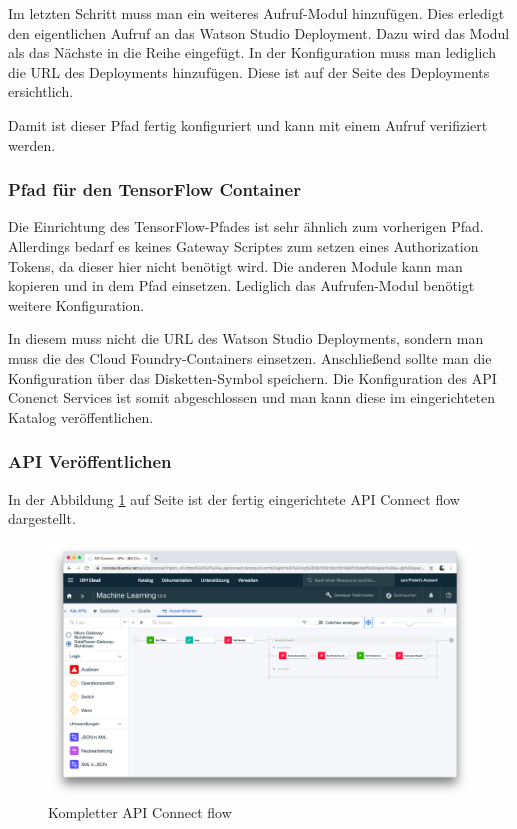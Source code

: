 Im letzten Schritt muss man ein weiteres Aufruf-Modul hinzufügen. Dies erledigt den eigentlichen Aufruf an das Watson
Studio Deployment. Dazu wird das Modul als das Nächste in die Reihe eingefügt. In der Konfiguration muss man lediglich
die URL des Deployments hinzufügen. Diese ist auf der Seite des Deployments ersichtlich.

Damit ist dieser Pfad fertig konfiguriert und kann mit einem Aufruf verifiziert werden.

\subsubsection*{Pfad für den TensorFlow Container}
Die Einrichtung des TensorFlow-Pfades ist sehr ähnlich zum vorherigen Pfad. Allerdings bedarf es keines Gateway Scriptes
zum setzen eines Authorization Tokens, da dieser hier nicht benötigt wird. Die anderen Module kann man kopieren und in
dem Pfad einsetzen. Lediglich das Aufrufen-Modul benötigt weitere Konfiguration.

In diesem muss nicht die URL des Watson Studio Deployments, sondern man muss die des Cloud Foundry-Containers einsetzen.
Anschließend sollte man die Konfiguration über das Disketten-Symbol speichern. Die Konfiguration des API Conenct Services
ist somit abgeschlossen und man kann diese im eingerichteten Katalog veröffentlichen.

\subsubsection{API Veröffentlichen}
In der Abbildung \ref{fig:umsetzung_api_connect} auf Seite \pageref{fig:umsetzung_api_connect} ist der fertig eingerichtete
API Connect flow dargestellt.

\begin{figure}[h]
    \centering
    \includegraphics[width=\textwidth]{images/kapitel_3/api_connect.png}
    \caption{Kompletter API Connect flow}
    \label{fig:umsetzung_api_connect}
\end{figure}

